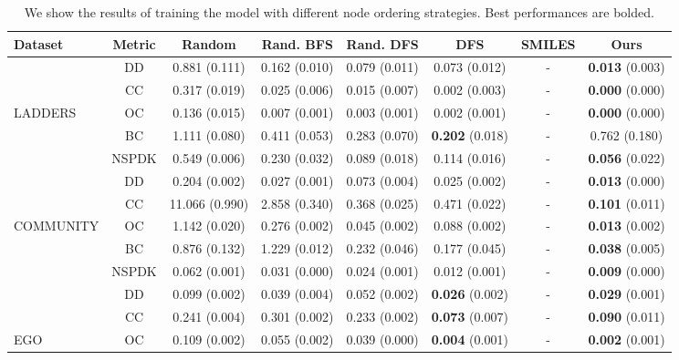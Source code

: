 \begin{table}
    \footnotesize
    \centering
    \caption{We show the results of training the model with different node ordering strategies. Best performances are bolded.}
    \label{tab:graph-ordering-qualitative}
    \begin{tabular}{lccccccc}
        \toprule
        \textbf{Dataset} & \textbf{Metric} & \textbf{Random} & \textbf{Rand. BFS} & \textbf{Rand. DFS} & \textbf{DFS} & \textbf{SMILES} & \textbf{Ours}\\
        \midrule
          & DD             & 0.881 (0.111) & 0.162 (0.010) & 0.079 (0.011) & 0.073 (0.012) & - & \textbf{0.013} (0.003)\\
          & CC             & 0.317 (0.019) & 0.025 (0.006) & 0.015 (0.007) & 0.002 (0.003) & - & \textbf{0.000} (0.000)\\
LADDERS   & OC             & 0.136 (0.015) & 0.007 (0.001) & 0.003 (0.001) & 0.002 (0.001) & - & \textbf{0.000} (0.000)\\
          & BC             & 1.111 (0.080) & 0.411 (0.053) & 0.283 (0.070) & \textbf{0.202} (0.018) & - & 0.762 (0.180)\\
          & NSPDK          & 0.549 (0.006) & 0.230 (0.032) & 0.089 (0.018) & 0.114 (0.016) & - & \textbf{0.056} (0.022)\\
        \midrule
          & DD             & 0.204 (0.002) & 0.027 (0.001) & 0.073 (0.004) & 0.025 (0.002) & - & \textbf{0.013} (0.000)\\
          & CC             & 11.066 (0.990) & 2.858 (0.340) & 0.368 (0.025) & 0.471 (0.022) & - & \textbf{0.101} (0.011)\\
COMMUNITY & OC             & 1.142 (0.020) & 0.276 (0.002) & 0.045 (0.002) & 0.088 (0.002) & - & \textbf{0.013} (0.002)\\
          & BC             & 0.876 (0.132) & 1.229 (0.012) & 0.232 (0.046) & 0.177 (0.045) & - & \textbf{0.038} (0.005)\\
          & NSPDK          & 0.062 (0.001) & 0.031 (0.000) & 0.024 (0.001) & 0.012 (0.001) & - & \textbf{0.009} (0.000)\\
        \midrule
          & DD             & 0.099 (0.002) & 0.039 (0.004) & 0.052 (0.002) & \textbf{0.026} (0.002) & - & \textbf{0.029} (0.001)\\
          & CC             & 0.241 (0.004) & 0.301 (0.002) & 0.233 (0.002) & \textbf{0.073} (0.007) & - & \textbf{0.090} (0.011)\\
EGO       & OC             & 0.109 (0.002) & 0.055 (0.002) & 0.039 (0.000) & \textbf{0.004} (0.001) & - & \textbf{0.002} (0.001)\\

\end{tabular}
\end{table}

